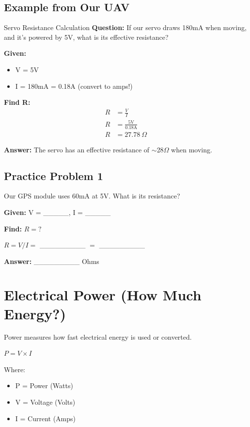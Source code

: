 \documentclass[11pt,letterpaper]{article}
\begin{document}
\subsection{Example from Our UAV}

\begin{examplebox}{Servo Resistance Calculation}
\textbf{Question:} If our servo draws 180mA when moving, and it's powered by 5V, what is its effective resistance?

\textbf{Given:}
\begin{itemize}
  \item V = 5V
  \item I = 180mA = 0.18A (convert to amps!)
\end{itemize}

\textbf{Find R:}
\begin{align*}
R &= \frac{V}{I}\\
R &= \frac{5\text{V}}{0.18\text{A}}\\
R &= 27.78~\Omega
\end{align*}

\textbf{Answer:} The servo has an effective resistance of $\sim$28$\Omega$ when moving.
\end{examplebox}

\subsection{Practice Problem 1}

Our GPS module uses 60mA at 5V. What is its resistance?

\textbf{Given:} V = \_\_\_\_\_, I = \_\_\_\_\_

\textbf{Find:} $R = ?$

$R = V / I = $ \_\_\_\_\_\_\_\_\_ $= $ \_\_\_\_\_\_\_\_\_

\textbf{Answer:} \_\_\_\_\_\_\_\_\_ Ohms

\section{Electrical Power (How Much Energy?)}

Power measures how fast electrical energy is used or converted.

\begin{formulabox}
$P = V \times I$
\end{formulabox}

Where:
\begin{itemize}
  \item P = Power (Watts)
  \item V = Voltage (Volts)
  \item I = Current (Amps)
\end{itemize}
\end{document}
